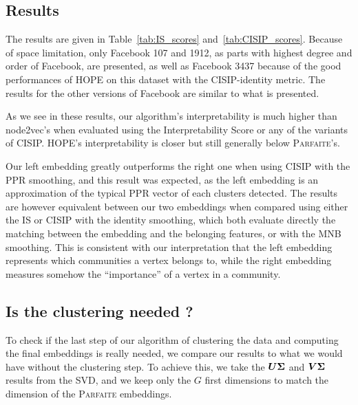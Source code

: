 
\subsection{Results}
The results are given in Table~\ref{tab:IS_scores} and~\ref{tab:CISIP_scores}. Because of space limitation, only Facebook 107 and 1912, as parts with highest degree and order of Facebook, are presented, as well as Facebook 3437 because of the good performances of HOPE on this dataset with the CISIP-identity metric. The results for the other versions of Facebook are similar to what is presented.

As we see in these results, our algorithm's interpretability is much higher than node2vec's when evaluated using the Interpretability Score or any of the variants of CISIP. HOPE's interpretability is closer but still generally below \textsc{Parfaite}'s.

Our left embedding greatly outperforms the right one when using CISIP with the PPR smoothing, and this result was expected, as the left embedding is an approximation of the typical PPR vector of each clusters detected. The results are however equivalent between our two embeddings when compared using either the IS or CISIP with the identity smoothing, %
which both evaluate directly the matching between the embedding and the belonging features, or with the MNB smoothing. This is consistent with our interpretation that the left embedding %
represents which communities a vertex belongs to, while the right embedding measures somehow the ``importance'' of a vertex in a community.

\subsection{Is the clustering needed ?}
To check if the last step of our algorithm of clustering the data and computing the final embeddings is really needed, we compare our results to what we would have without the clustering step. To achieve this, we take the $\boldsymbol{U}\boldsymbol{\Sigma}$ and $\boldsymbol{V}\boldsymbol{\Sigma}$ results from the SVD, and we keep only the $G$ first dimensions 
to match the dimension of the \textsc{Parfaite} embeddings.

